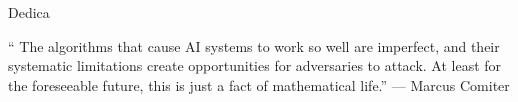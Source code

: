 
\cleardoublepage
{}
\thispagestyle{empty}

\vspace*{3cm}


\medskip

\begin{center}
Dedica
\end{center}

“ The algorithms
that cause AI systems
to work so well are
imperfect, and their
systematic limitations
create opportunities for
adversaries to attack. At
least for the foreseeable
future, this is just a fact of
mathematical life.”
 --- Marcus Comiter